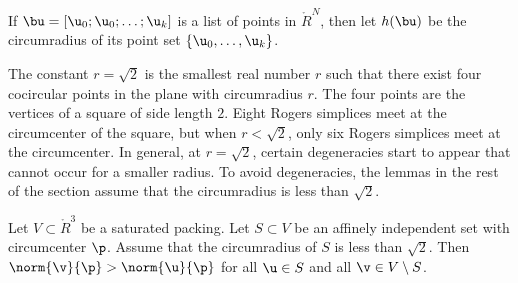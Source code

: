 \begin{definition}[h]
% 
If $\bu=[\u_0;\u_0;\ldots;\u_k]$ is a list of points in $\ring{R}^N$, then
let $h(\bu)$ be the
circumradius of its point set $\{ \u_0,\ldots, \u_k\}$.
\end{definition}
%

The constant $r=\sqrt2$ is the smallest real number $r$ such that
there exist four cocircular points in the plane with circumradius $r$.
The four points are the vertices of a square of side length $2$.
Eight Rogers simplices meet at the circumcenter of the square, but
when $r<\sqrt2$, only six Rogers simplices meet at the circumcenter.
In general, at $r=\sqrt2$, certain degeneracies start to appear that
cannot occur for a smaller radius.  To avoid degeneracies, 
the  lemmas in the rest of the section assume that the circumradius is less than
$\sqrt2$.

\begin{lemma}[nondegeneracy]\label{lemma:sqrt2-close} 
  Let $V\subset\ring{R}^3$ be a saturated packing.  Let $S\subset V$
  be an affinely independent set with circumcenter $\p$.  Assume that
  the circumradius of $S$ is less than $\sqrt2$.  Then
  $\norm{\v}{\p}>\norm{\u}{\p}$ for all $\u\in S$ and all $\v\in
  V\setminus S$.
\end{lemma}

